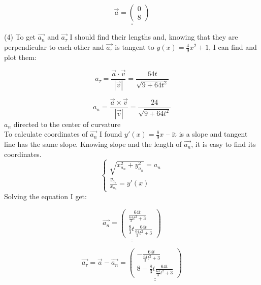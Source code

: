 \documentclass[a4paper,11pt,oneside,article]{memoir}
\def\doubleunderline#1{\underline{\underline{#1}}}
\begin{document}
\begin{equation*}
\doubleunderline{
\overrightarrow{a}=
    \begin{pmatrix}
    0\\
    8
    \end{pmatrix}
}
\end{equation*}

(4) To get $\overrightarrow{a_n}$ and $\overrightarrow{a_\tau}$ I should find their lengths and, knowing that they are perpendicular to each other and $\overrightarrow{a_\tau}$ is tangent to $y(x) = \frac{4}{9} x^2 +1$, I can find and plot them:

\begin{equation*}
    a_\tau = \frac{\overrightarrow{a} \cdot \overrightarrow{v}}{|\overrightarrow{v}|} = \frac{64t}{\sqrt{9+64t^2}}
\end{equation*}

\begin{equation*}
    a_n = \frac{\overrightarrow{a} \times \overrightarrow{v}}{|\overrightarrow{v}|} = \frac{24}{\sqrt{9+64t^2}}
\end{equation*}
$a_n$ directed to the center of curvature\\
To calculate coordinates of $\overrightarrow{a_n}$ I found $y'(x) = \frac{8}{9}x$ – it is a slope and tangent line has the same slope. Knowing slope and the length of $\overrightarrow{a_n}$, it is easy to find its coordinates. 
\begin{equation*}
    \begin{cases}
        \sqrt{x^2_{a_n} + y^2_{a_n}} = a_n
        \\
        \frac{y_{a_n}}{x_{a_n}} = y'(x)
\end{cases}
\end{equation*}
Solving the equation I get:

\begin{equation*}
\doubleunderline{
    \overrightarrow{a_n} = 
    \begin{pmatrix}
        \frac{64t}{\frac{64}{3}t^2 +3}
        \\
        \frac{8}{3}t \frac{64t}{\frac{64}{3}t^2 +3}
    \end{pmatrix}
}
\end{equation*}

\begin{equation}
    \overrightarrow{a_\tau} = \overrightarrow{a} - \overrightarrow{a_n} = 
    \doubleunderline{
        \begin{pmatrix}
            -\frac{64t}{\frac{64}{3}t^2 +3}
            \\
            8-\frac{8}{3}t \frac{64t}{\frac{64}{3}t^2 +3}
        \end{pmatrix}
    }
\end{equation}
\end{document}
